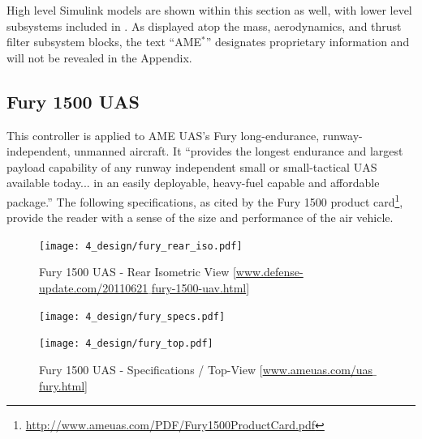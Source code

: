 \documentclass[12pt]{ucthesis}
\begin{document}
High level Simulink models are shown within this section as well, with lower level subsystems included in . As displayed atop the mass, aerodynamics, and thrust filter subsystem blocks, the text ``AME$^*$'' designates proprietary information and will not be revealed in the Appendix.

\subsection{Fury 1500 UAS}
\label{subsec: uav_fury_1500}
%
This controller is applied to AME UAS's Fury long-endurance, runway-independent, unmanned aircraft. It ``provides the longest endurance and largest payload capability of any runway independent small or small-tactical UAS available today... in an easily deployable, heavy-fuel capable and affordable package.'' The following specifications, as cited by the Fury 1500 product card\footnote{\href{http://www.ameuas.com/PDF/Fury1500ProductCard.pdf}{http://www.ameuas.com/PDF/Fury1500ProductCard.pdf}}, provide the reader with a sense of the size and performance of the air vehicle.
%
\begin{figure}[H]%
	\centering 
	\texttt{[image: 4\_design/fury\_rear\_iso.pdf]}%
	\vspace{-2em}
	\caption{Fury 1500 UAS - Rear Isometric View [\href{http://defense-update.com/20110621_fury-1500-uav.html}{www.defense-update.com/20110621$\_$fury-1500-uav.html}]}%
	\label{fig: fury1500_iso}%
\end{figure}%
%
\begin{figure}[H]%
\vspace{-1em}
	\begin{minipage}[b]{0.55\linewidth}%
		\begin{flushright}%
			\texttt{[image: 4\_design/fury\_specs.pdf]}%
			\label{tab: fury_specs}%
		\end{flushright}%
	\end{minipage}%
	\hspace{0.5cm}%
	\begin{minipage}[b]{0.45\linewidth}%
		\begin{flushleft}%
			\texttt{[image: 4\_design/fury\_top.pdf]}%
			\label{fig: fury_1500_top}%
		\end{flushleft}%
	\end{minipage}%
	\caption{Fury 1500 UAS - Specifications / Top-View  [\href{http://www.ameuas.com/uas_fury.html}{www.ameuas.com/uas$\_$fury.html}]}%
\end{figure}%
\end{document}
